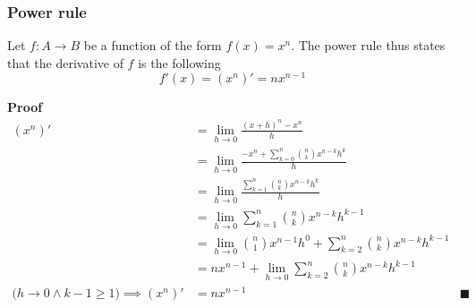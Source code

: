 \subsubsection{Power rule}
Let \(f : A \to B\) be a function of the form \(f(x) = x^n\). The power rule thus states that the derivative of \(f\) is the following
\begin{equation}
    f'(x) = \left(x^n\right)' = nx^{n-1}
\end{equation}

\textbf{Proof}
\begin{align*}
    \left(x^n\right)' &= \lim_{h\to 0}\frac{(x + h)^n - x^n}{h} \\
    &= \lim_{h \to 0}\frac{-x^n + \sum_{k=0}^{n}\binom{n}{k}x^{n-k}h^{k}}{h} \\
    &= \lim_{h \to 0} \frac{\sum_{k=1}^{n}\binom{n}{k}x^{n-k}h^{k}}{h} \\
    &= \lim_{h \to 0} \sum_{k=1}^{n}\binom{n}{k}x^{n-k}h^{k-1} \\
    &= \lim_{h \to 0} \binom{n}{1} x^{n-1} h^0 + \sum_{k=2}^{n}\binom{n}{k}x^{n-k}h^{k-1} \\
    &= n x^{n-1} + \lim_{h \to 0} \sum_{k=2}^{n}\binom{n}{k}x^{n-k}h^{k-1} \\
    \Big(h \to 0 \land k - 1 \ge 1\Big) \implies \left(x^n\right)' &= n x^{n-1} & \blacksquare
\end{align*}